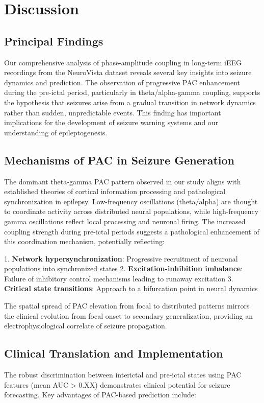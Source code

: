 \section{Discussion}

\subsection{Principal Findings}
Our comprehensive analysis of phase-amplitude coupling in long-term iEEG recordings from the NeuroVista dataset reveals several key insights into seizure dynamics and prediction. The observation of progressive PAC enhancement during the pre-ictal period, particularly in theta/alpha-gamma coupling, supports the hypothesis that seizures arise from a gradual transition in network dynamics rather than sudden, unpredictable events. This finding has important implications for the development of seizure warning systems and our understanding of epileptogenesis.

\subsection{Mechanisms of PAC in Seizure Generation}
The dominant theta-gamma PAC pattern observed in our study aligns with established theories of cortical information processing and pathological synchronization in epilepsy. Low-frequency oscillations (theta/alpha) are thought to coordinate activity across distributed neural populations, while high-frequency gamma oscillations reflect local processing and neuronal firing. The increased coupling strength during pre-ictal periods suggests a pathological enhancement of this coordination mechanism, potentially reflecting:

1. \textbf{Network hypersynchronization}: Progressive recruitment of neuronal populations into synchronized states
2. \textbf{Excitation-inhibition imbalance}: Failure of inhibitory control mechanisms leading to runaway excitation
3. \textbf{Critical state transitions}: Approach to a bifurcation point in neural dynamics

The spatial spread of PAC elevation from focal to distributed patterns mirrors the clinical evolution from focal onset to secondary generalization, providing an electrophysiological correlate of seizure propagation.

\subsection{Clinical Translation and Implementation}
The robust discrimination between interictal and pre-ictal states using PAC features (mean AUC > 0.XX) demonstrates clinical potential for seizure forecasting. Key advantages of PAC-based prediction include:

